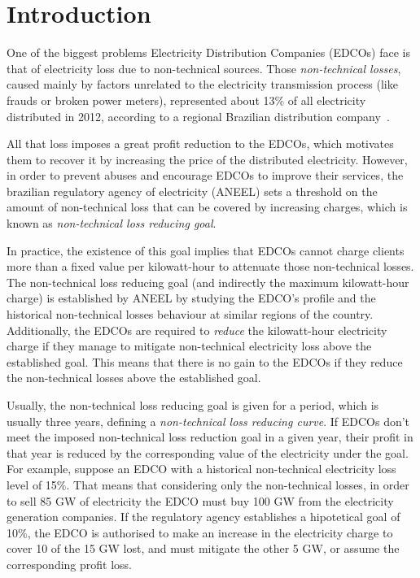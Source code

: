 \section{Introduction}
\label{sec:intro}

One of the biggest problems Electricity Distribution Companies (EDCOs) face is that of electricity loss due to non-technical
sources. Those \textit{non-technical losses}, caused mainly by factors unrelated to the electricity transmission process 
(like frauds or broken power meters), represented about 13\% of all electricity distributed in 2012, according to a regional Brazilian distribution company~\cite{ANEEL2012}.

All that loss imposes a great profit reduction to the EDCOs, which motivates them to recover it by 
increasing the price of the distributed electricity. However, in order to prevent abuses and encourage EDCOs to improve 
their services, the brazilian regulatory agency of electricity (ANEEL) sets a threshold on the amount of non-technical loss
that can be covered by increasing charges, which is known as \textit{non-technical loss reducing goal}.

In practice, the existence of this goal implies that EDCOs cannot charge clients more than a fixed 
value per kilowatt-hour to attenuate those non-technical losses.
The non-technical loss reducing goal (and indirectly the maximum kilowatt-hour charge) is established by ANEEL by studying the EDCO's 
profile and the historical non-technical losses behaviour at similar regions of the country.
Additionally, the EDCOs are required to \textit{reduce} the kilowatt-hour electricity charge if they manage to mitigate non-technical
electricity loss above the established goal. 
This means that there is no gain to the EDCOs if they reduce the non-technical losses above the established goal.

Usually, the non-technical loss reducing goal is given for a period, which is usually three years,
defining a \textit{non-technical loss reducing curve}.
If EDCOs don't meet the imposed non-technical loss reduction goal in a given year, their profit in that year
is reduced by the corresponding value of the electricity under the goal. For example, suppose an EDCO with a historical
non-technical electricity loss level of 15\%. That means that considering only the non-technical losses, in order to sell 85 GW 
of electricity the EDCO must buy 100 GW from the electricity generation companies. If the regulatory agency establishes a hipotetical 
goal of 10\%, the EDCO is authorised to make an increase in the electricity charge to cover 10 of the 15 GW lost, and must mitigate 
the other 5 GW, or assume the corresponding profit loss.

